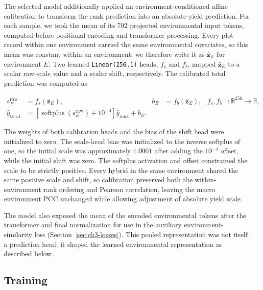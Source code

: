 The selected model additionally applied an environment-conditioned affine calibration to transform the rank prediction into an absolute-yield prediction. For each sample, we took the mean of its 702 projected environmental input tokens, computed before positional encoding and transformer processing. Every plot record within one environment carried the same environmental covariates, so this mean was constant within an environment; we therefore write it as $\bar{\mathbf z}_E$ for environment $E$. Two learned \texttt{Linear(256,1)} heads, $f_s$ and $f_b$, mapped $\bar{\mathbf z}_E$ to a scalar raw-scale value and a scalar shift, respectively. The calibrated total prediction was computed as

\begin{equation}\label{eq:ch3-affine-calibration}
    \begin{aligned}
        s_E^{\mathrm{raw}} &= f_s(\bar{\mathbf z}_E), &
        b_E &= f_b(\bar{\mathbf z}_E), &
        f_s,f_b &: \mathbb{R}^{256} \rightarrow \mathbb{R}, \\
        \hat{y}_{\mathrm{total}}
        &= \left[\operatorname{softplus}\!\left(s_E^{\mathrm{raw}}\right)+10^{-4}\right]
        \hat y_{\mathrm{rank}} + b_E.
    \end{aligned}
\end{equation}

The weights of both calibration heads and the bias of the shift head were initialized to zero. The scale-head bias was initialized to the inverse softplus of one, so the initial scale was approximately $1.0001$ after adding the $10^{-4}$ offset, while the initial shift was zero. The softplus activation and offset constrained the scale to be strictly positive. Every hybrid in the same environment shared the same positive scale and shift, so calibration preserved both the within-environment rank ordering and Pearson correlation, leaving the macro environment PCC unchanged while allowing adjustment of absolute yield scale.

The model also exposed the mean of the encoded environmental tokens after the transformer and final normalization for use in the auxiliary environment-similarity loss (Section~\ref{sec:ch3-losses}). This pooled representation was not itself a prediction head; it shaped the learned environmental representation as described below.

\subsection{Training}\label{sec:ch3-training}

